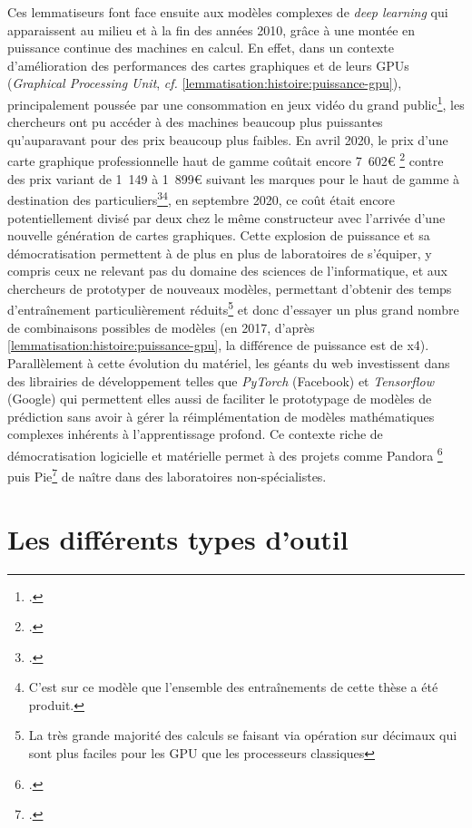 Ces lemmatiseurs font face ensuite aux modèles complexes de \textit{deep learning} qui apparaissent au milieu et à la fin des années 2010, grâce à une montée en puissance continue des machines en calcul. En effet, dans un contexte d'amélioration des performances des cartes graphiques et de leurs GPUs (\textit{Graphical Processing Unit}, \textit{cf.} \ref{lemmatisation:histoire:puissance-gpu}), principalement poussée par une consommation en jeux vidéo du grand public\footcite{tanz_how_2017}, les chercheurs ont pu accéder à des machines beaucoup plus puissantes qu'auparavant pour des prix beaucoup plus faibles. En avril 2020, le prix d'une carte graphique professionnelle haut de gamme coûtait encore 7~602€ \footcite{noauthor_pny_2020} contre des prix variant de 1~149 à 1~899€ suivant les marques pour le haut de gamme à destination des particuliers\footcite{noauthor_recherche_2020}\footnote{C'est sur ce modèle que l'ensemble des entraînements de cette thèse a été produit.}, en septembre 2020, ce coût était encore potentiellement divisé par deux chez le même constructeur avec l'arrivée d'une nouvelle génération de cartes graphiques. Cette explosion de puissance et sa démocratisation permettent à de plus en plus de laboratoires de s'équiper, y compris ceux ne relevant pas du domaine des sciences de l'informatique, et aux chercheurs de prototyper de nouveaux modèles, permettant d'obtenir des temps d'entraînement particulièrement réduits\footnote{La très grande majorité des calculs se faisant via opération sur décimaux qui sont plus faciles pour les GPU que les processeurs classiques} et donc d'essayer un plus grand nombre de combinaisons possibles de modèles (en 2017, d'après \ref{lemmatisation:histoire:puissance-gpu}, la différence de puissance est de x4). Parallèlement à cette évolution du matériel, les géants du web investissent dans des librairies de développement telles que \textit{PyTorch} (Facebook) et \textit{Tensorflow} (Google) qui permettent elles aussi de faciliter le prototypage de modèles de prédiction sans avoir à gérer la réimplémentation de modèles mathématiques complexes inhérents à l'apprentissage profond. Ce contexte riche de démocratisation logicielle et matérielle permet à des projets comme Pandora \footcites{kestemont_lemmatization_2017}{de_gussem_integrated_2017} puis Pie\footcite{manjavacas_improving_2019} de naître dans des laboratoires non-spécialistes. 

\section{Les différents types d'outil}

